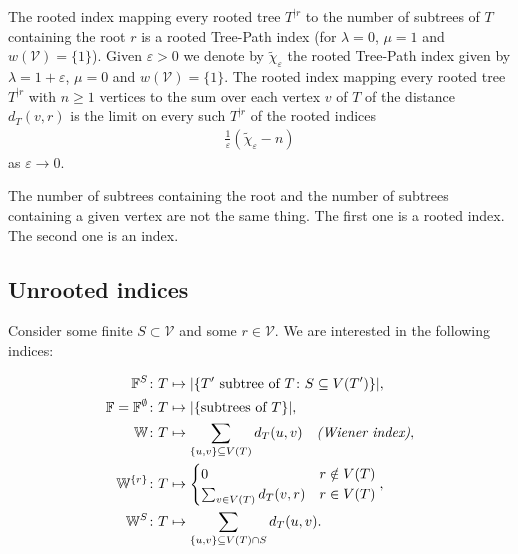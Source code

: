 \documentclass[11 pt]{modarticle}
\newcommand{\vset}{\mathcal{V}}
\newcommand{\wmap}{w}
\newcommand{\size}[1]{|#1|}
\newcommand{\vsetof}[1]{V(#1)}
\newcommand{\distance}[3]{d_{#3}(#1,#2)}
\newcommand{\rtree}[2]{{#1}^{\lvert #2}}
\begin{document}
The rooted index mapping every rooted tree $\rtree{T}{r}$ to the number of subtrees of $T$ containing the root $r$ is a rooted Tree-Path index (for $\lambda = 0$, $\mu = 1$ and $\wmap(\vset) = \{1\}$). Given $\varepsilon > 0$ we denote by $\widetilde{\chi}_{\varepsilon}$ the rooted Tree-Path index given by $\lambda = 1 + \varepsilon$, $\mu = 0$ and $\wmap(\vset) = \{1\}$. The rooted index mapping every rooted tree $\rtree{T}{r}$ with $n \geq 1$ vertices to the sum over each vertex $v$ of $T$ of the distance $\distance{v}{r}{T}$ is the limit on every such $\rtree{T}{r}$ of the rooted indices
\begin{eqnarray*}
	\frac{1}{\varepsilon}(\widetilde{\chi}_{\varepsilon} - n)
\end{eqnarray*}
as $\varepsilon \rightarrow 0$.

\begin{rem}
The number of subtrees containing the root and the number of subtrees containing a given vertex are not the same thing. The first one is a rooted index. The second one is an index.
\end{rem}

\subsection{Unrooted indices}

Consider some finite $S \subset \vset$ and some $r \in \vset$. We are interested in the following indices:

\begin{align*}
    \mathbb{F}^S \colon T &\mapsto \size{\{T' \text{ subtree of } T \colon S \subseteq V(T')\}},\\
    \mathbb{F} = \mathbb{F}^{\emptyset} \colon T &\mapsto \size{\{\text{subtrees of } T\}},\\
    \mathbb{W} \colon T &\mapsto \sum_{\{u,v\} \subseteq \vsetof{T}} \distance{u}{v}{T} \quad \text{\emph{(Wiener index)}},\\
    \mathbb{W}^{\{r\}} \colon T &\mapsto \begin{cases} 0 &r \notin V(T) \\ \sum_{v \in V(T)} \distance{v}{r}{T} &r \in \vsetof{T} \end{cases},\\
    \mathbb{W}^S \colon T &\mapsto \sum_{\{u,v\} \subseteq \vsetof{T} \cap S} \distance{u}{v}{T}.
\end{align*}


\end{document}
